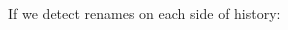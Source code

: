 \documentclass[compress,t]{beamer}
\begin{document}
\begin{frame}
{{\begin{multicols}{2}
\begin{minipage}{0.48\textwidth}
\begin{block}{If we detect renames on each side of history:}
    \end{block}
    \end{minipage}
  \end{multicols}

  }} %


\end{frame}

\end{document}
